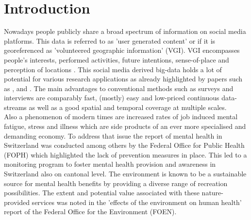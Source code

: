 \chapter{Introduction}
Nowadays people publicly share a broad spectrum of information on social media platforms. This data is referred to as 'user generated content' or if it is georeferenced as 'volunteered geographic information' (VGI). VGI encompasses people's interests, performed activities, future intentions, sense-of-place and perception of locations \parencite{Goodchild2007}. This social media derived big-data holds a lot of potential for various research applications as already highlighted by papers such as \parencite{DiMinin2015}, \parencite{DiMinin2017} and \parencite{Meentemeyer2016}. The main advantages to conventional methods such as surveys and interviews are comparably fast, (mostly) easy and low-priced continuous data-streams as well as a good spatial and temporal coverage at multiple scales.\\
Also a phenomenon of modern times are increased rates of job induced mental fatigue, stress and illness which are side products of an ever more specialised and demanding economy. To address that issue the report of mental health in Switzerland \parencite{Ruesch2003} was conducted among others by the Federal Office for Public Health (FOPH) which highlighted the lack of prevention measures in place. This led to a monitoring program to foster mental health provision and awareness in Switzerland \parencite{Schuler2012} also on cantonal level. The environment is known to be a sustainable source for mental health benefits by providing a diverse range of recreation possibilities. The extent and potential value associated with these nature-provided services was noted in the 'effects of the environment on human health' report \parencite{Ragettli2017} of the Federal Office for the Environment (FOEN).\\
\newline
